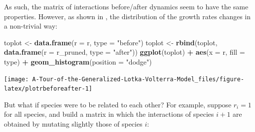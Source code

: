 \documentclass[]{book}
\newenvironment{Shaded}{\begin{snugshade}}{\end{snugshade}}
\newcommand{\DataTypeTok}[1]{\textcolor[rgb]{0.13,0.29,0.53}{#1}}
\newcommand{\KeywordTok}[1]{\textcolor[rgb]{0.13,0.29,0.53}{\textbf{#1}}}
\newcommand{\NormalTok}[1]{#1}
\newcommand{\OperatorTok}[1]{\textcolor[rgb]{0.81,0.36,0.00}{\textbf{#1}}}
\newcommand{\StringTok}[1]{\textcolor[rgb]{0.31,0.60,0.02}{#1}}
\begin{document}
As such, the matrix of interactions before/after dynamics seem to have the same properties. However, as shown in \citet{servan2018coexistence}, the distribution of the growth rates changes in a non-trivial way:

\begin{Shaded}
\begin{Highlighting}[]
\NormalTok{toplot <-}\StringTok{ }\KeywordTok{data.frame}\NormalTok{(}\DataTypeTok{r =}\NormalTok{ r, }\DataTypeTok{type =} \StringTok{"before"}\NormalTok{)}
\NormalTok{toplot <-}\StringTok{ }\KeywordTok{rbind}\NormalTok{(toplot, }\KeywordTok{data.frame}\NormalTok{(}\DataTypeTok{r =}\NormalTok{ r_pruned, }\DataTypeTok{type =} \StringTok{"after"}\NormalTok{))}
\KeywordTok{ggplot}\NormalTok{(toplot) }\OperatorTok{+}\StringTok{ }\KeywordTok{aes}\NormalTok{(}\DataTypeTok{x =}\NormalTok{ r, }\DataTypeTok{fill =}\NormalTok{ type) }\OperatorTok{+}\StringTok{ }\KeywordTok{geom_histogram}\NormalTok{(}\DataTypeTok{position =} \StringTok{"dodge"}\NormalTok{)}
\end{Highlighting}
\end{Shaded}

\begin{center}\texttt{[image: A-Tour-of-the-Generalized-Lotka-Volterra-Model\_files/figure-latex/plotrbeforeafter-1]} \end{center}

But what if species were to be related to each other? For example, suppose \(r_i = 1\) for all species, and build a matrix in which the interactions of species \(i + 1\) are obtained by mutating slightly those of species \(i\):
\end{document}
